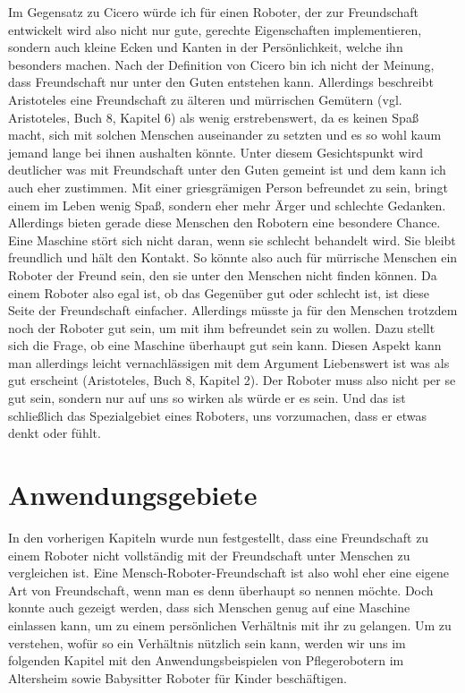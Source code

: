 \documentclass[12pt]{article}
\begin{document}
Im Gegensatz zu Cicero würde ich für einen Roboter, der zur Freundschaft entwickelt wird also nicht nur gute, gerechte Eigenschaften implementieren, sondern auch kleine Ecken und Kanten in der Persönlichkeit, welche ihn besonders machen.\newline
Nach der Definition von Cicero bin ich nicht der Meinung, dass Freundschaft nur unter den Guten entstehen kann. Allerdings beschreibt Aristoteles eine Freundschaft zu älteren und mürrischen Gemütern (vgl. Aristoteles, Buch 8, Kapitel 6) als wenig erstrebenswert, da es keinen Spaß macht, sich mit solchen Menschen auseinander zu setzten und es so wohl kaum jemand lange bei ihnen aushalten könnte. Unter diesem Gesichtspunkt wird deutlicher was mit Freundschaft unter den Guten gemeint ist und dem kann ich auch eher zustimmen. Mit einer griesgrämigen Person befreundet zu sein, bringt einem im Leben wenig Spaß, sondern eher mehr Ärger und schlechte Gedanken.\newline 
Allerdings bieten gerade diese Menschen den Robotern eine besondere Chance. Eine Maschine stört sich nicht daran, wenn sie schlecht behandelt wird. Sie bleibt freundlich und hält den Kontakt. So könnte also auch für mürrische Menschen ein Roboter der Freund sein, den sie unter den Menschen nicht finden können.\newline
Da einem Roboter also egal ist, ob das Gegenüber gut oder schlecht ist, ist diese Seite der Freundschaft einfacher. Allerdings müsste ja für den Menschen trotzdem noch der Roboter gut sein, um mit ihm befreundet sein zu wollen. Dazu stellt sich die Frage, ob eine Maschine überhaupt gut sein kann. Diesen Aspekt kann man allerdings leicht vernachlässigen mit dem Argument  \glqq Liebenswert ist was als gut erscheint \grqq (Aristoteles, Buch 8, Kapitel 2). Der Roboter muss also nicht per se gut sein, sondern nur auf uns so wirken als würde er es sein. Und das ist schließlich das Spezialgebiet eines Roboters, uns vorzumachen, dass er etwas denkt oder fühlt.

\section{Anwendungsgebiete}
In den vorherigen Kapiteln wurde nun festgestellt, dass eine Freundschaft zu einem Roboter nicht vollständig mit der Freundschaft unter Menschen zu vergleichen ist. Eine Mensch-Roboter-Freundschaft ist also wohl eher eine eigene Art von Freundschaft, wenn man es denn überhaupt so nennen möchte. Doch konnte auch gezeigt werden, dass sich Menschen genug auf eine Maschine einlassen kann, um zu einem persönlichen Verhältnis mit ihr zu gelangen. Um zu verstehen, wofür so ein Verhältnis nützlich sein kann, werden wir uns im folgenden Kapitel mit den Anwendungsbeispielen von Pflegerobotern im Altersheim sowie Babysitter Roboter für Kinder beschäftigen.
\end{document}
